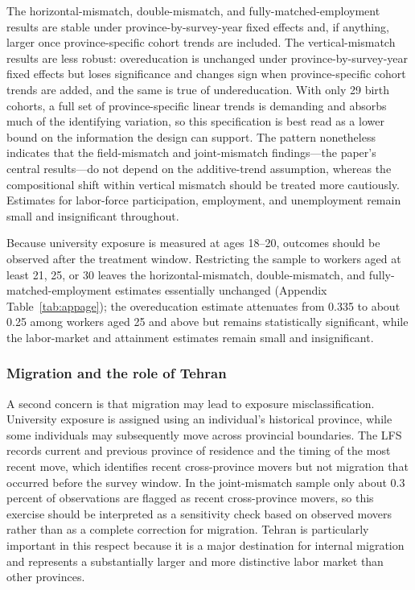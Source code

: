 The horizontal-mismatch, double-mismatch, and fully-matched-employment results are stable under province-by-survey-year fixed effects and, if anything, larger once province-specific cohort trends are included. The vertical-mismatch results are less robust: overeducation is unchanged under province-by-survey-year fixed effects but loses significance and changes sign when province-specific cohort trends are added, and the same is true of undereducation. With only 29 birth cohorts, a full set of province-specific linear trends is demanding and absorbs much of the identifying variation, so this specification is best read as a lower bound on the information the design can support. The pattern nonetheless indicates that the field-mismatch and joint-mismatch findings---the paper's central results---do not depend on the additive-trend assumption, whereas the compositional shift within vertical mismatch should be treated more cautiously. Estimates for labor-force participation, employment, and unemployment remain small and insignificant throughout.

Because university exposure is measured at ages 18--20, outcomes should be observed after the treatment window. Restricting the sample to workers aged at least 21, 25, or 30 leaves the horizontal-mismatch, double-mismatch, and fully-matched-employment estimates essentially unchanged (Appendix Table~\ref{tab:appage}); the overeducation estimate attenuates from 0.335 to about 0.25 among workers aged 25 and above but remains statistically significant, while the labor-market and attainment estimates remain small and insignificant.

\subsubsection{Migration and the role of Tehran}

A second concern is that migration may lead to exposure misclassification. University exposure is assigned using an individual's historical province, while some individuals may subsequently move across provincial boundaries. The LFS records current and previous province of residence and the timing of the most recent move, which identifies recent cross-province movers but not migration that occurred before the survey window. In the joint-mismatch sample only about 0.3 percent of observations are flagged as recent cross-province movers, so this exercise should be interpreted as a sensitivity check based on observed movers rather than as a complete correction for migration. Tehran is particularly important in this respect because it is a major destination for internal migration and represents a substantially larger and more distinctive labor market than other provinces.

